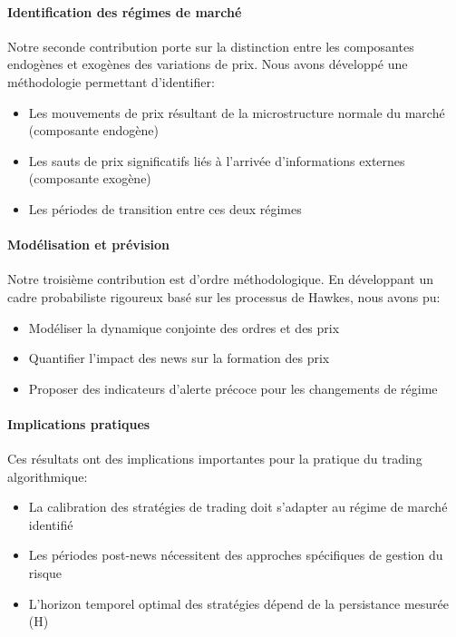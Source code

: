 \documentclass[12pt,a4paper]{article}
\theoremstyle{definition}
\theoremstyle{remark}
\begin{document}
\paragraph{\textbf{Identification des régimes de marché}} Notre seconde contribution porte sur la distinction entre les composantes endogènes et exogènes des variations de prix. Nous avons développé une méthodologie permettant d'identifier:
\begin{itemize}
    \item Les mouvements de prix résultant de la microstructure normale du marché (composante endogène)
    \item Les sauts de prix significatifs liés à l'arrivée d'informations externes (composante exogène)
    \item Les périodes de transition entre ces deux régimes
\end{itemize}

\paragraph{\textbf{Modélisation et prévision}} Notre troisième contribution est d'ordre méthodologique. En développant un cadre probabiliste rigoureux basé sur les processus de Hawkes, nous avons pu:
\begin{itemize}
    \item Modéliser la dynamique conjointe des ordres et des prix
    \item Quantifier l'impact des news sur la formation des prix
    \item Proposer des indicateurs d'alerte précoce pour les changements de régime
\end{itemize}

\paragraph{\textbf{Implications pratiques}} Ces résultats ont des implications importantes pour la pratique du trading algorithmique:
\begin{itemize}
    \item La calibration des stratégies de trading doit s'adapter au régime de marché identifié
    \item Les périodes post-news nécessitent des approches spécifiques de gestion du risque
    \item L'horizon temporel optimal des stratégies dépend de la persistance mesurée (H)
\end{itemize}
\end{document}
